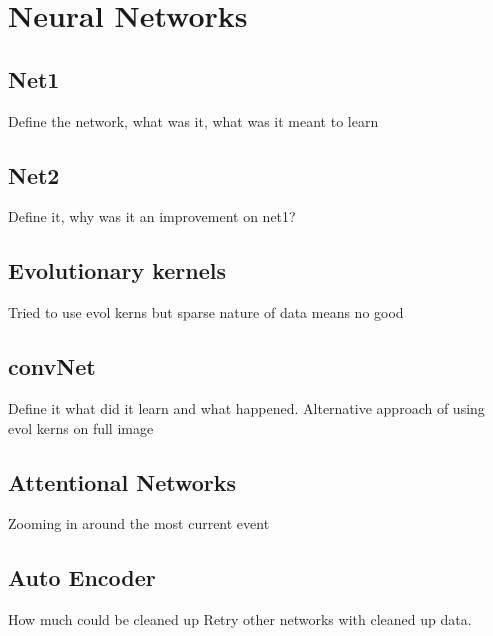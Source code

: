 \chapter{Neural Networks}

\section{Net1}
Define the network, what was it, what was it meant to learn

\section{Net2}
Define it, why was it an improvement on net1?

\section{Evolutionary kernels}
Tried to use evol kerns but sparse nature of data means no good

\section{convNet}
Define it what did it learn and what happened.
Alternative approach of using evol kerns on full image

\section{Attentional Networks}
Zooming in around the most current event

\section{Auto Encoder}
How much could be cleaned up
Retry other networks with cleaned up data. 



